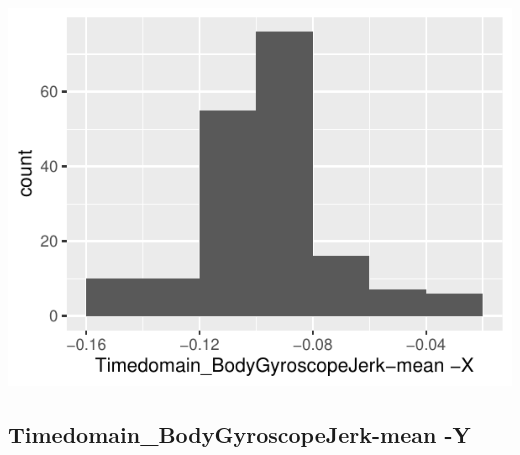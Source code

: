 \documentclass[
]{article}
\begin{document}
\begin{minipage}{0.25 \textwidth}

\includegraphics{codebook_tidydatasub_files/figure-latex/Var-27-Timedomain-BodyGyroscopeJerk-mean--X-1.pdf}

\end{minipage}

\noindent\makebox[\linewidth]{\rule{\textwidth}{0.4pt}}

\hypertarget{timedomain_bodygyroscopejerk-mean--y}{%
\subsection{Timedomain\_BodyGyroscopeJerk-mean
-Y}\label{timedomain_bodygyroscopejerk-mean--y}}
\end{document}
